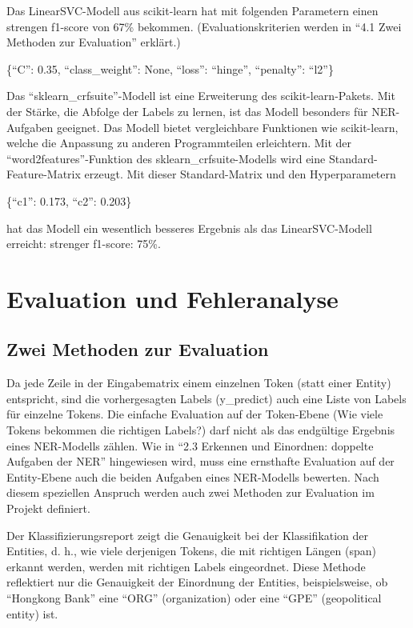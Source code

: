 \documentclass[paper=A4, ngerman, fontsize=12pt]{article}
\begin{document}
	\indent
	Das LinearSVC-Modell aus scikit-learn hat mit folgenden Parametern einen strengen f1-score von 67\% bekommen. (Evaluationskriterien werden in \enquote{4.1 Zwei Methoden zur Evaluation} erklärt.)
	
	\indent
	\{\enquote{C}: 0.35, \enquote{class\_weight}: None, \enquote{loss}: \enquote{hinge}, \enquote{penalty}: \enquote{l2}\}
	
	\indent
	Das \enquote{sklearn\_crfsuite}-Modell ist eine Erweiterung des scikit-learn-Pakets. Mit der Stärke, die Abfolge der Labels zu lernen, ist das Modell besonders für NER-Aufgaben geeignet. Das Modell bietet vergleichbare Funktionen wie scikit-learn, welche die Anpassung zu anderen Programmteilen erleichtern. Mit der \enquote{word2features}-Funktion des sklearn\_crfsuite-Modells wird eine Standard-Feature-Matrix erzeugt. Mit dieser Standard-Matrix und den Hyperparametern
	
	\indent
	 \{\enquote{c1}: 0.173, \enquote{c2}: 0.203\}
	 
	 \indent
	 hat das Modell ein wesentlich besseres Ergebnis als das LinearSVC-Modell erreicht: strenger f1-score: 75\%.
	 
	\section{Evaluation und Fehleranalyse}
	
	\subsection{Zwei Methoden zur Evaluation}
	\noindent
	Da jede Zeile in der Eingabematrix einem einzelnen Token (statt einer Entity) entspricht, sind die vorhergesagten Labels (y\_predict) auch eine Liste von Labels für einzelne Tokens. Die einfache Evaluation auf der Token-Ebene (Wie viele Tokens bekommen die richtigen Labels?) darf nicht als das endgültige Ergebnis eines NER-Modells zählen. Wie in \enquote{2.3 Erkennen und Einordnen: doppelte Aufgaben der NER} hingewiesen wird, muss eine ernsthafte Evaluation auf der Entity-Ebene auch die beiden Aufgaben eines NER-Modells bewerten. Nach diesem speziellen Anspruch werden auch zwei Methoden zur Evaluation im Projekt definiert. 
	
	\indent
	Der Klassifizierungsreport zeigt die Genauigkeit bei der Klassifikation der Entities, d. h., wie viele derjenigen Tokens, die mit richtigen Längen (span) erkannt werden, werden mit richtigen Labels eingeordnet. Diese Methode reflektiert nur die Genauigkeit der Einordnung der Entities, beispielsweise, ob \enquote{Hongkong Bank} eine \enquote{ORG} (organization) oder eine \enquote{GPE} (geopolitical entity) ist.
	
\end{document}
